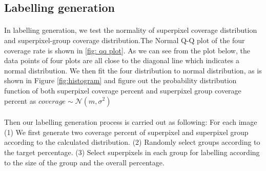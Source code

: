 \documentclass[runningheads,a4paper]{llncs}
\begin{document}
\subsection{Labelling generation}
\paragraph{} In labelling generation, we test the normality of superpixel coverage distribution and superpixel-group coverage distribution.The Normal Q-Q plot of the four coverage rate is shown in \ref{fig: qq plot}. As we can see from the plot below, the data points of four plots are all close to the diagonal line which indicates a normal distribution. We then fit the four distribution to normal distribution, as is shown in Figure \ref{fig:histogram} and figure out the probability distribution function of both superpixel coverage percent and superpixel group coverage percent as $coverage \sim \mathcal{N} (m,\sigma^2)$
\paragraph{} Then our labelling generation process is carried out as following: For each image (1) We first generate two coverage percent of superpixel and superpixel group according to the calculated  distribution. (2) Randomly select groups according to the target percentage. (3) Select superpixels in each group for labelling according to the size of the group and the overall percentage.
\end{document}
